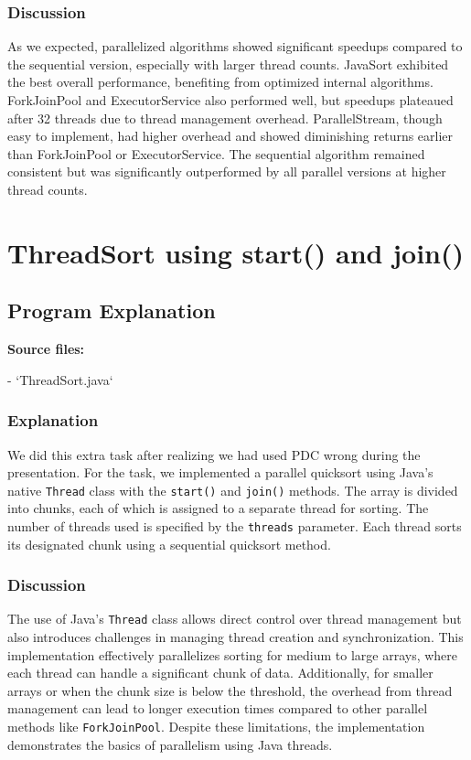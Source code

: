 \documentclass{article}
\begin{document}
\subsubsection{Discussion}
As we expected, parallelized algorithms showed significant speedups compared to the sequential version, especially with larger thread counts. JavaSort exhibited the best overall performance, benefiting from optimized internal algorithms. ForkJoinPool and ExecutorService also performed well, but speedups plateaued after 32 threads due to thread management overhead. ParallelStream, though easy to implement, had higher overhead and showed diminishing returns earlier than ForkJoinPool or ExecutorService. The sequential algorithm remained consistent but was significantly outperformed by all parallel versions at higher thread counts.


\newpage
\section{ThreadSort using start() and join()}

\subsection{Program Explanation}
\textbf{Source files:}

- `ThreadSort.java`

\subsubsection{Explanation}
We did this extra task after realizing we had used PDC wrong during the presentation. For the task, we implemented a parallel quicksort using Java's native \texttt{Thread} class with the \texttt{start()} and \texttt{join()} methods. The array is divided into chunks, each of which is assigned to a separate thread for sorting. The number of threads used is specified by the \texttt{threads} parameter. Each thread sorts its designated chunk using a sequential quicksort method. 

\subsubsection{Discussion}
The use of Java's \texttt{Thread} class allows direct control over thread management but also introduces challenges in managing thread creation and synchronization. This implementation effectively parallelizes sorting for medium to large arrays, where each thread can handle a significant chunk of data. Additionally, for smaller arrays or when the chunk size is below the threshold, the overhead from thread management can lead to longer execution times compared to other parallel methods like \texttt{ForkJoinPool}. Despite these limitations, the implementation demonstrates the basics of parallelism using Java threads.


\newpage
\printbibliography
\end{document}
